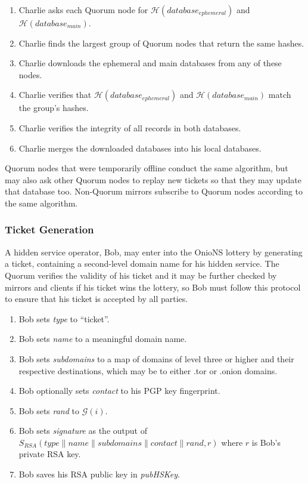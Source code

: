 \documentclass[USenglish,oneside,twocolumn]{article}
\newcommand*\concat{\mathbin{\|}}
\begin{document}
\begin{enumerate}
	\item Charlie asks each Quorum node for $ \mathcal{H}(\mathit{database}_{ephemeral}) $ and $ \mathcal{H}(\mathit{database}_{main}) $.
	\item Charlie finds the largest group of Quorum nodes that return the same hashes.
	\item Charlie downloads the ephemeral and main databases from any of these nodes.
	\item Charlie verifies that $ \mathcal{H}(\mathit{database}_{ephemeral}) $ and $ \mathcal{H}(\mathit{database}_{main}) $ match the group's hashes.
	\item Charlie verifies the integrity of all records in both databases.
	\item Charlie merges the downloaded databases into his local databases.
\end{enumerate}

Quorum nodes that were temporarily offline conduct the same algorithm, but may also ask other Quorum nodes to replay new tickets so that they may update that database too. Non-Quorum mirrors subscribe to Quorum nodes according to the same algorithm.


\subsubsection{Ticket Generation}
\label{sec:ticketGeneration}

A hidden service operator, Bob, may enter into the OnioNS lottery by generating a ticket, containing a second-level domain name for his hidden service. The Quorum verifies the validity of his ticket and it may be further checked by mirrors and clients if his ticket wins the lottery, so Bob must follow this protocol to ensure that his ticket is accepted by all parties.

\begin{enumerate}
	\item Bob sets \emph{type} to ``ticket''.
	\item Bob sets \emph{name} to a meaningful domain name.
	\item Bob sets \emph{subdomains} to a map of domains of level three or higher and their respective destinations, which may be to either .tor or .onion domains.
	\item Bob optionally sets \emph{contact} to his PGP key fingerprint.
	\item Bob sets \emph{rand} to $ \mathcal{G}(i) $.
	\item Bob sets \emph{signature} as the output of $ S_{\mathit{RSA}}(\mathit{type} \concat \mathit{name} \concat \mathit{subdomains} \concat \mathit{contact} \concat \mathit{rand}, r) $ where $ r $ is Bob's private RSA key.
	\item Bob saves his RSA public key in \emph{pubHSKey}.
\end{enumerate}
\end{document}
